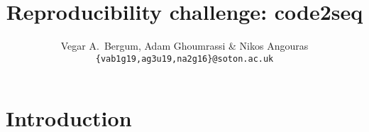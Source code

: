 \documentclass{article} %
\title{Reproducibility challenge: code2seq}
\author{Vegar A.~Bergum, Adam Ghoumrassi \& Nikos Angouras \\
\texttt{\{vab1g19,ag3u19,na2g16\}@soton.ac.uk}
}
\begin{document}
\maketitle

\begin{abstract}
\end{abstract}

\section{Introduction}
\cite{alon2019}




\end{document}
